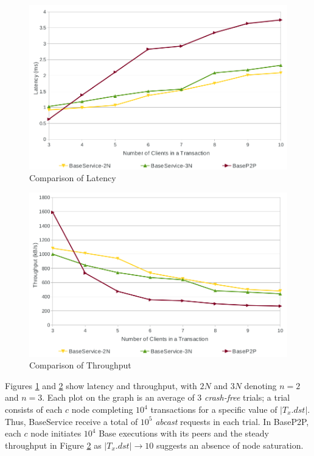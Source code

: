 \begin{figure}[htbp!]
 \includegraphics[width=\textwidth,height=\textheight,keepaspectratio]{latency}
 \caption{Comparison of Latency}
 \label{fig:LatencyGraph}
\end{figure}

\begin{figure}[htbp!]
 \includegraphics[width=\textwidth,height=\textheight,keepaspectratio]{throughput}
 \caption{Comparison of Throughput}
 \label{fig:ThroughputGraph}
\end{figure}

Figures \ref{fig:LatencyGraph} and \ref{fig:ThroughputGraph} show latency and throughput, with $2N$ and $3N$ denoting $n=2$ and $n=3$. Each plot on the graph is an average of 3 \emph{crash-free} trials; a trial consists of each $c$ node completing $10^4$ transactions for a specific value of $|T_x.dst|$. Thus, BaseService receive a total of $10^5$ \emph{abcast} requests in each trial. In BaseP2P, each $c$ node initiates $10^4$ Base executions with its peers and the steady throughput in Figure \ref{fig:ThroughputGraph} as $|T_x.dst| \rightarrow 10$ suggests an absence of node saturation.

